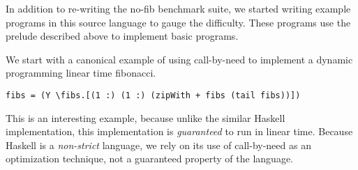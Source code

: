 In addition to re-writing the no-fib benchmark suite, we started writing example
programs in this source language to gauge the difficulty. These programs use the
prelude described above to implement basic programs. 

We start with a canonical example of using call-by-need to implement a
dynamic programming linear time fibonacci. 

\begin{verbatim}
fibs = (Y \fibs.[(1 :) (1 :) (zipWith + fibs (tail fibs))])
\end{verbatim}

This is an interesting example, because unlike the similar Haskell
implementation, this implementation is \emph{guaranteed} to run in linear time.
Because Haskell is a \emph{non-strict} language, we rely on its use of
call-by-need as an optimization technique, not a guaranteed property of the
language. 


